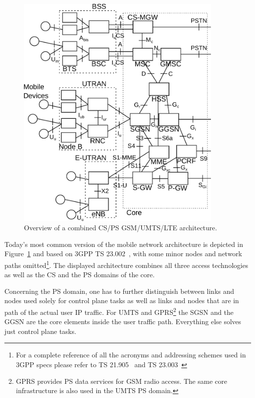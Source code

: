 \begin{figure}[htbp]
	\centering
	\includegraphics[width=0.9\textwidth]{images/3gpp-physical-arch.pdf}
	\caption{Overview of a combined \gls{CS}/\gls{PS} \gls{GSM}/\gls{UMTS}/\gls{LTE} architecture.}
\label{c4:fig:psdomain}
\end{figure}

Today's most common version of the mobile network architecture is depicted in Figure~\ref{c4:fig:psdomain} and based on \gls{3GPP} \gls{TS} 23.002~\cite{3gpp.23.002}, with some minor nodes and network paths omitted\footnote{For a complete reference of all the acronyms and addressing schemes used in \gls{3GPP} specs please refer to \gls{TS} 21.905~\cite{3gpp.21.905} and \gls{TS} 23.003~\cite{3gpp.23.003}}. The displayed architecture combines all three access technologies as well as the \gls{CS} and the \gls{PS} domains of the core. 

Concerning the \gls{PS} domain, one has to further distinguish between links and nodes used solely for control plane tasks as well as links and nodes that are in path of the actual user \gls{IP} traffic. For \gls{UMTS} and \gls{GPRS}\footnote{\gls{GPRS} provides \gls{PS} data services for \gls{GSM} radio access. The same core infrastructure is also used in the \gls{UMTS} \gls{PS} domain.} the \gls{SGSN} and the \gls{GGSN} are the core elements inside the user traffic path. Everything else solves just control plane tasks.

